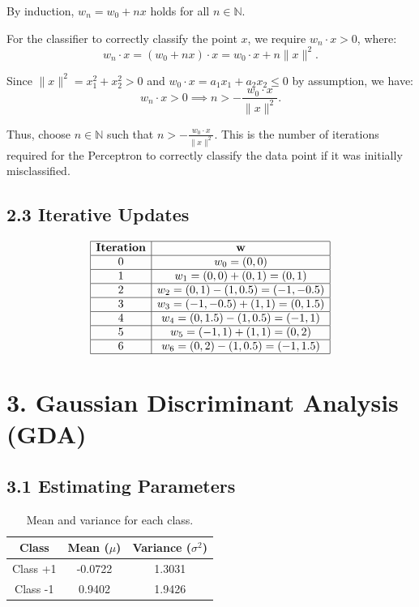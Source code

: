\documentclass[12pt]{article}
\begin{document}
By induction, \(w_n = w_0 + nx\) holds for all \(n \in \mathbb{N}\).

For the classifier to correctly classify the point \(x\), we require \(w_n \cdot x > 0\), where:
\[
w_n \cdot x = (w_0 + nx) \cdot x = w_0 \cdot x + n \|x\|^2.
\]

Since \(\|x\|^2 = x_1^2 + x_2^2 > 0\) and \(w_0 \cdot x = a_1x_1 + a_2x_2 \leq 0\) by assumption, we have:
\[
w_n \cdot x > 0 \implies n > -\frac{w_0 \cdot x}{\|x\|^2}.
\]

Thus, choose \(n \in \mathbb{N}\) such that \(n > -\frac{w_0 \cdot x}{\|x\|^2}\). This is the number of iterations required for the Perceptron to correctly classify the data point if it was initially misclassified.

\subsection*{2.3 Iterative Updates}

\[
\begin{array}{|c|c|}
\hline
\textbf{Iteration} & \mathbf{w} \\ \hline
0 & w_0 = (0, 0) \\ \hline
1 & w_1 = (0, 0) + (0, 1) = (0, 1) \\ \hline
2 & w_2 = (0, 1) - (1, 0.5) = (-1, -0.5) \\ \hline
3 & w_3 = (-1, -0.5) + (1, 1) = (0, 1.5) \\ \hline
4 & w_4 = (0, 1.5) - (1, 0.5) = (-1, 1) \\ \hline
5 & w_5 = (-1, 1) + (1, 1) = (0, 2) \\ \hline
6 & w_6 = (0, 2) - (1, 0.5) = (-1, 1.5) \\ \hline
\end{array}
\]

\section*{3. Gaussian Discriminant Analysis (GDA)}

\subsection*{3.1 Estimating Parameters}
\begin{table}[h!]
\centering
\begin{tabular}{|c|c|c|}
\hline
\textbf{Class} & \textbf{Mean (\(\mu\))} & \textbf{Variance (\(\sigma^2\))} \\ \hline
Class +1       & -0.0722                 & 1.3031                          \\ \hline
Class -1       & 0.9402                  & 1.9426                          \\ \hline
\end{tabular}
\caption{Mean and variance for each class.}
\label{tab:class_stats}
\end{table}
\end{document}
